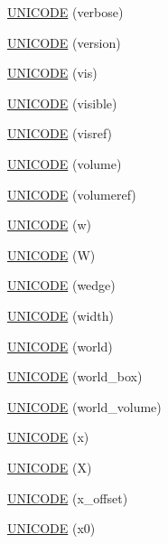 \begin{DoxyCompactItemize}
\hyperlink{namespace_d_d4hep_1_1_x_m_l_a6fef579aa8b964f163b6bd0a5dba0dfa}{U\+N\+I\+C\+O\+DE} (verbose)
\item 
\hyperlink{namespace_d_d4hep_1_1_x_m_l_a632e6f9f26b064fd2a03502276ce9618}{U\+N\+I\+C\+O\+DE} (version)
\item 
\hyperlink{namespace_d_d4hep_1_1_x_m_l_a99a03e4dd90ede6fd13b47651a666b4a}{U\+N\+I\+C\+O\+DE} (vis)
\item 
\hyperlink{namespace_d_d4hep_1_1_x_m_l_a926cb418b7488003cd68a90c86bfbe9e}{U\+N\+I\+C\+O\+DE} (visible)
\item 
\hyperlink{namespace_d_d4hep_1_1_x_m_l_a2b257d2b8e7ef1b5366412661b7389cd}{U\+N\+I\+C\+O\+DE} (visref)
\item 
\hyperlink{namespace_d_d4hep_1_1_x_m_l_add4e355449c9f87c33a9a5fd0b53d5fb}{U\+N\+I\+C\+O\+DE} (volume)
\item 
\hyperlink{namespace_d_d4hep_1_1_x_m_l_aed97d8b9631642de33dd19b423dbfa47}{U\+N\+I\+C\+O\+DE} (volumeref)
\item 
\hyperlink{namespace_d_d4hep_1_1_x_m_l_a78e581c638d6c80d58bd762db781dc20}{U\+N\+I\+C\+O\+DE} (w)
\item 
\hyperlink{namespace_d_d4hep_1_1_x_m_l_afc3ecb3c673108aa0280992595b7fe97}{U\+N\+I\+C\+O\+DE} (W)
\item 
\hyperlink{namespace_d_d4hep_1_1_x_m_l_a580cf1ec963c574cab83816588cf4cb3}{U\+N\+I\+C\+O\+DE} (wedge)
\item 
\hyperlink{namespace_d_d4hep_1_1_x_m_l_a0d1ef7fb3901bb28fe1d8a5b6e27a0b2}{U\+N\+I\+C\+O\+DE} (width)
\item 
\hyperlink{namespace_d_d4hep_1_1_x_m_l_ae94c683fa69273318b6d476f3284bd5b}{U\+N\+I\+C\+O\+DE} (world)
\item 
\hyperlink{namespace_d_d4hep_1_1_x_m_l_a1058f369b75341da0d644e9548dcfa30}{U\+N\+I\+C\+O\+DE} (world\+\_\+box)
\item 
\hyperlink{namespace_d_d4hep_1_1_x_m_l_a22a545538ae3b5ec429edc6def4b4a30}{U\+N\+I\+C\+O\+DE} (world\+\_\+volume)
\item 
\hyperlink{namespace_d_d4hep_1_1_x_m_l_aa81f798502a97a2f58baf12aad7892d0}{U\+N\+I\+C\+O\+DE} (x)
\item 
\hyperlink{namespace_d_d4hep_1_1_x_m_l_a300572f08741250a889bb63a49dc2fe8}{U\+N\+I\+C\+O\+DE} (X)
\item 
\hyperlink{namespace_d_d4hep_1_1_x_m_l_a10fd1c3466ee3bf3990e323bb2c64020}{U\+N\+I\+C\+O\+DE} (x\+\_\+offset)
\item 
\hyperlink{namespace_d_d4hep_1_1_x_m_l_a5c206f909ef697ef9ec33d6c22cbb42a}{U\+N\+I\+C\+O\+DE} (x0)

\end{DoxyCompactItemize}
